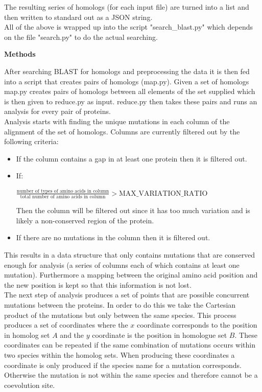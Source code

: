 \documentclass[11pt]{article}
\begin{document}
The resulting series of homologs (for each input file) are turned
into a list and then written to standard out as a JSON string. \\

All of the above is wrapped up into the script "search\_blast.py"
which depends on the file "search.py" to do the actual searching. \\

\begin{center}
\textbf{Methods}
\end{center}
After searching BLAST for homologs and preprocessing the data it is
then fed into a script that creates pairs of homologs
(map.py). Given a set of homologs map.py creates pairs of homologs
between all elements of the set supplied which is then given to
reduce.py as input. reduce.py then takes these pairs and runs an analysis for every pair
of proteins. \\

Analysis starts with finding the unique mutations in each column of
the alignment of the set of homologs. Columns are currently filtered out by
the following criteria: \\

\begin{itemize}
  \item If the column contains a gap in at least one protein then it
    is filtered out.
  \item If: 
    \begin{center}
      $\frac{\mbox{number of types of amino acids in column}}{\mbox{total number
          of amino acids in column}} > \mbox{MAX\_VARIATION\_RATIO}$
    \end{center}
    Then the column will be filtered out since it has too much
    variation and is likely a non-conserved region of the protein.
  \item If there are no mutations in the column then it is filtered out.
\end{itemize}

This results in a data structure that only contains mutations that are
conserved enough for analysis (a series of columns each of which
contains at least one mutation). Furthermore a mapping between the
original amino acid position and the new position is kept so that this
information is not lost. \\

The next step of analysis produces a set of points that are possible
concurrent mutations between the proteins. In order to do this we take
the Cartesian product of the mutations but only between the same
species. This process produces a set of coordinates where the $x$
coordinate corresponds to the position in homolog set $A$ and the $y$
coordinate is the position in homologue set $B$. These coordinates can be
repeated if the same combination of mutations occurs within two
species within the homolog sets. When producing these coordinates a
coordinate is only produced if the species name for a mutation
corresponds. Otherwise the mutation is not within the same species and
therefore cannot be a coevolution site.\\
\end{document}
